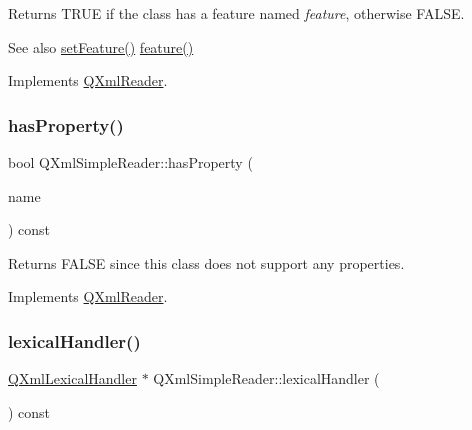 Returns T\+R\+UE if the class has a feature named {\itshape feature}, otherwise F\+A\+L\+SE.

\begin{DoxySeeAlso}{See also}
\mbox{\hyperlink{class_q_xml_simple_reader_a7e435e46bfe139249be78d89a89ff629}{set\+Feature()}} \mbox{\hyperlink{class_q_xml_simple_reader_ae6b1a973ea59fc35b75d45ac5e30a303}{feature()}} 
\end{DoxySeeAlso}


Implements \mbox{\hyperlink{class_q_xml_reader_ac9835c64b96d42b60f0bec5962153582}{Q\+Xml\+Reader}}.

\mbox{\label{class_q_xml_simple_reader_ad93428643a263ad7dfc57f321cea65bb}} 
\subsubsection{\texorpdfstring{hasProperty()}{hasProperty()}}
{\footnotesize\ttfamily bool Q\+Xml\+Simple\+Reader\+::has\+Property (\begin{DoxyParamCaption}\item[{const \mbox{\hyperlink{class_q_string}{Q\+String}} \&}]{name }\end{DoxyParamCaption}) const\hspace{0.3cm}{\ttfamily [virtual]}}

Returns F\+A\+L\+SE since this class does not support any properties. 

Implements \mbox{\hyperlink{class_q_xml_reader_ac26bf52bfab045196e8adf980e92bab6}{Q\+Xml\+Reader}}.

\mbox{\label{class_q_xml_simple_reader_a56cc7b748fc84448423a1d768e42befd}} 
\subsubsection{\texorpdfstring{lexicalHandler()}{lexicalHandler()}}
{\footnotesize\ttfamily \mbox{\hyperlink{class_q_xml_lexical_handler}{Q\+Xml\+Lexical\+Handler}} $\ast$ Q\+Xml\+Simple\+Reader\+::lexical\+Handler (\begin{DoxyParamCaption}{ }\end{DoxyParamCaption}) const\hspace{0.3cm}{\ttfamily [virtual]}}


